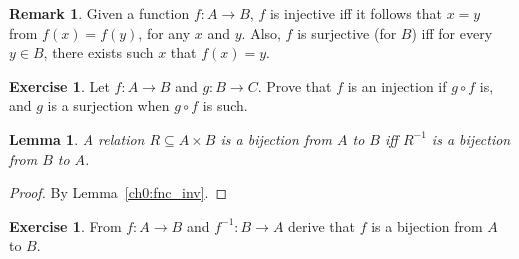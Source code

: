 \documentclass[12pt,notitlepage]{article}
\theoremstyle{plain}
\newtheorem{lemma}[thm]{Lemma}
\theoremstyle{definition}
\newtheorem{exc}[thm]{Exercise}
\newtheorem{rem}[thm]{Remark}
\theoremstyle{plain}
\newcommand{\sbs}{\subseteq}
\newcommand{\1}{\mathbf{1}}
\newcommand{\0}{\mathbf{0}}
\newcommand{\mcomm}[1]{}
\begin{document}
\begin{rem}
Given a function $f\colon A \to B$, $f$ is injective iff it follows that $x = y$ from $f(x) = f(y)$, for any $x$ and $y$. Also, $f$ is surjective (for $B$) iff for every $y \in B$, there exists such $x$ that $f(x) = y$.
\end{rem}
\mcomm{This point may be not that obvious for some students. It makes sense to give a detailed proof.}

\begin{exc}
Let $f\colon A \to B$ and $g\colon B \to C$. Prove that $f$ is an injection if $g\circ f$ is, and $g$ is a surjection when $g \circ f$ is such.
\end{exc}

\begin{lemma}\label{ch0:bi_inv}
A relation $R \sbs A \times B$ is a bijection from $A$ to $B$ iff $R^{-1}$ is a bijection from $B$ to $A$.
\end{lemma}
\begin{proof} By Lemma~\ref{ch0:fnc_inv}.
\end{proof}

\begin{exc}
From $f\colon A \to B$ and $f^{-1}\colon B \to A$ derive that $f$ is a bijection from $A$ to $B$.
\end{exc}
\end{document}
